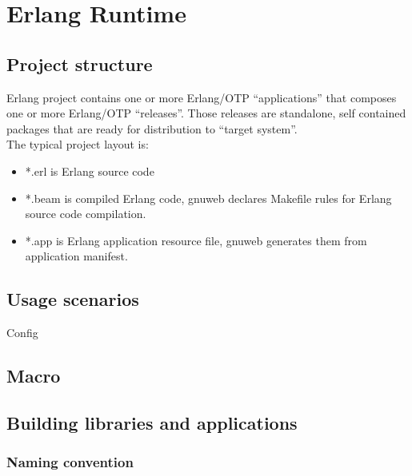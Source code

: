 \section{Erlang Runtime}

\subsection{Project structure}

Erlang project contains one or more Erlang/OTP ``applications'' that composes one or more Erlang/OTP ``releases''. Those releases are standalone, self contained packages that are ready for distribution to ``target system''.\\

The typical project layout is:\\



\begin{itemize}
\item *.erl is Erlang source code
\item *.beam is compiled Erlang code, gnuweb declares Makefile rules for Erlang source code compilation.
\item *.app is Erlang application resource file, gnuweb generates them from application manifest.
\end{itemize}



\subsection{Usage scenarios}
Config

\subsection{Macro}


\subsection{Building libraries and applications}

\subsubsection{Naming convention}

